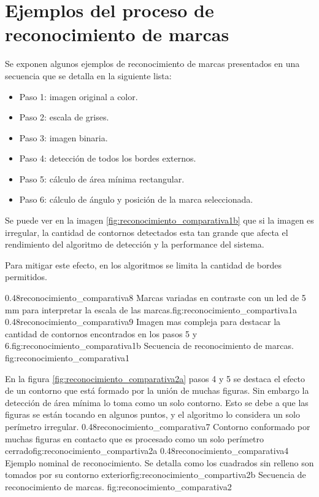 
\chapter{Ejemplos del proceso de reconocimiento de marcas} %
\label{AppendixA} %

         Se exponen algunos ejemplos de reconocimiento de marcas presentados en una secuencia que se detalla en la siguiente lista:
         \begin{itemize}
            \item{Paso 1: imagen original a color.}
            \item{Paso 2: escala de grises.}
            \item{Paso 3: imagen binaria.}
            \item{Paso 4: detección de todos los bordes externos.}
            \item{Paso 5: cálculo de área mínima rectangular.}
            \item{Paso 6: cálculo de ángulo y posición de la marca seleccionada.}
         \end{itemize}

         Se puede ver en la imagen \ref{fig:reconocimiento_comparativa1b} que si la imagen es irregular, la cantidad de contornos detectados esta tan grande que afecta el rendimiento del algoritmo de detección y la performance del sistema. \par
         Para mitigar este efecto, en los algoritmos se limita la cantidad de bordes permitidos.

\subfigab
         {0.48}{reconocimiento_comparativa8} {Marcas variadas en contraste con un led de 5 mm para interpretar la escala de las marcas.}{fig:reconocimiento_compartiva1a}
         {0.48}{reconocimiento_comparativa9} {Imagen mas compleja para destacar la cantidad de contornos encontrados en los pasos 5 y 6.}{fig:reconocimiento_comparativa1b}
         {Secuencia de reconocimiento de marcas.}
         {fig:reconocimiento_comparativa1}

         En la figura \ref{fig:reconocimiento_comparativa2a} pasos 4 y 5 se destaca el efecto de un contorno que está formado por la unión de muchas figuras. Sin embargo la detección de área mínima lo toma como un solo contorno. Esto se debe a que las figuras se están tocando en algunos puntos, y el algoritmo lo considera un solo perímetro irregular.
\subfigab
         {0.48}{reconocimiento_comparativa7} {Contorno conformado por muchas figuras en contacto que es procesado como un solo perímetro cerrado}{fig:reconocimiento_compartiva2a}
         {0.48}{reconocimiento_comparativa4} {Ejemplo nominal de reconocimiento. Se detalla como los cuadrados sin relleno son tomados por su contorno exterior}{fig:reconocimiento_compartiva2b}
         {Secuencia de reconocimiento de marcas.}
         {fig:reconocimiento_comparativa2}




